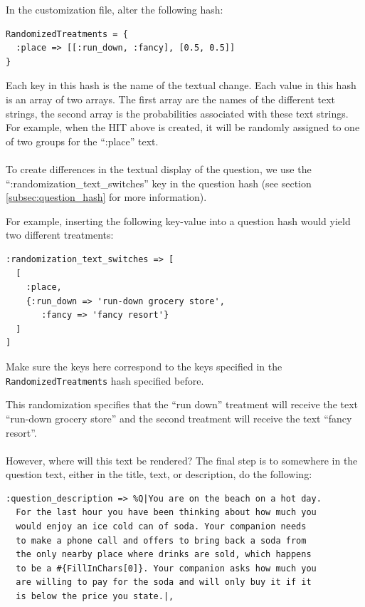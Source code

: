 \documentclass[12pt]{article}
\begin{document}
In the customization file, alter the following hash:

\begin{verbatim}
RandomizedTreatments = {
  :place => [[:run_down, :fancy], [0.5, 0.5]]
}
\end{verbatim}

Each key in this hash is the name of the textual change. Each value in this hash is an array of two arrays. The first array are the names of the different text strings, the second array is the probabilities associated with these text strings. For example, when the HIT above is created, it will be randomly assigned to one of two groups for the ``:place'' text.\\
\\

To create differences in the textual display of the question, we use the ``:randomization\_text\_switches'' key in the question hash (see section \ref{subsec:question_hash} for more information).

For example, inserting the following key-value into a question hash would yield two different treatments:

\begin{verbatim}
:randomization_text_switches => [
  [
    :place,
    {:run_down => 'run-down grocery store', 
       :fancy => 'fancy resort'}
  ]
]
\end{verbatim}

Make sure the keys here correspond to the keys specified in the \texttt{RandomizedTreatments} hash specified before.

This randomization specifies that the ``run down'' treatment will receive the text ``run-down grocery store'' and the second treatment will receive the text ``fancy resort''.\\
\\
However, where will this text be rendered? The final step is to somewhere in the question text, either in the title, text, or description, do the following:

\begin{verbatim}
:question_description => %Q|You are on the beach on a hot day.
  For the last hour you have been thinking about how much you
  would enjoy an ice cold can of soda. Your companion needs 
  to make a phone call and offers to bring back a soda from
  the only nearby place where drinks are sold, which happens
  to be a #{FillInChars[0]}. Your companion asks how much you
  are willing to pay for the soda and will only buy it if it
  is below the price you state.|,
\end{verbatim}
\end{document}
